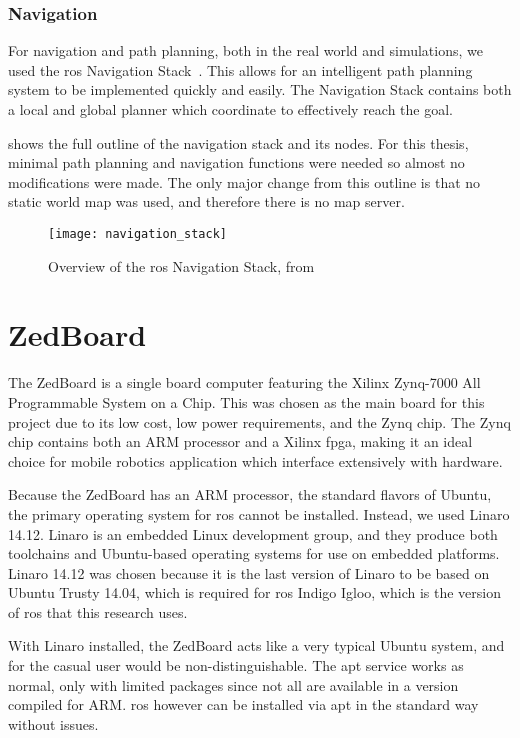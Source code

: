 \documentclass[thesis.tex]{subfile}
\begin{document}
\subsubsection{Navigation}
For navigation and path planning, both in the real world and simulations, we used the \gls{ros} Navigation Stack~\cite{ros_navigation}. This allows for an intelligent path planning system to be implemented quickly and easily. The Navigation Stack contains both a local and global planner which coordinate to effectively reach the goal. 

 shows the full outline of the navigation stack and its nodes. For this thesis, minimal path planning and navigation functions were needed so almost no modifications were made. The only major change from this outline is that no static world map was used, and therefore there is no map server.

\begin{figure}[htbp]
\texttt{[image: navigation\_stack]}
\caption[Overview of the \gls{ros} Navigation Stack]{Overview of the \gls{ros} Navigation Stack, from~\cite{NavigationStack}}
\label{fig:navigation_stack}
\end{figure}

\section{ZedBoard}
The ZedBoard is a single board computer featuring the Xilinx Zynq-7000 All Programmable System on a Chip. This was chosen as the main board for this project due to its low cost, low power requirements, and the Zynq chip. The Zynq chip contains both an ARM processor and a Xilinx \gls{fpga}, making it an ideal choice for mobile robotics application which interface extensively with hardware.
 
Because the ZedBoard has an ARM processor, the standard flavors of Ubuntu, the primary operating system for \gls{ros} cannot be installed. Instead, we used Linaro 14.12. Linaro is an embedded Linux development group, and they produce both toolchains and Ubuntu-based operating systems for use on embedded platforms. Linaro 14.12 was chosen because it is the last version of Linaro to be based on Ubuntu Trusty 14.04, which is required for \gls{ros} Indigo Igloo, which is the version of \gls{ros} that this research uses.

With Linaro installed, the ZedBoard acts like a very typical Ubuntu system, and for the casual user would be non-distinguishable. The apt service works as normal, only with limited packages since not all are available in a version compiled for ARM. \gls{ros} however can be installed via apt in the standard way without issues.
\end{document}
